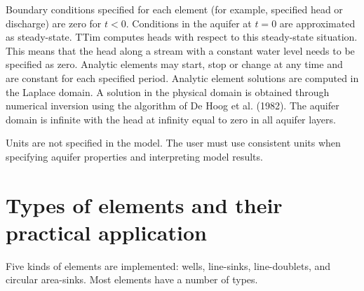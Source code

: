 \documentclass [10pt,letterpaper] {article}
\begin{document}
Boundary
conditions specified for each element (for example, specified head or
discharge) are zero for $t<0$. Conditions in the aquifer at $t=0$ are approximated as steady-state. TTim computes heads with respect to this steady-state situation. This means that the head along a stream with a constant water level needs to be specified as zero.
Analytic elements may start, stop or change at any time and are constant for each specified period. Analytic
element solutions are computed in the Laplace domain. A solution
in the physical domain is obtained through numerical inversion
using the algorithm of De Hoog et al. (1982). The aquifer domain
is infinite with the head at infinity equal to zero in all aquifer layers.

Units are not specified in the model. The user must use consistent
units when specifying aquifer properties and interpreting model
results.



\section{Types of elements and their practical application}
Five kinds of elements are implemented: wells, line-sinks, line-doublets, and circular area-sinks. Most elements have a number of types.
\renewcommand{\labelitemi}{$\circ$}
\renewcommand{\labelitemii}{$\circ$}
\end{document}
